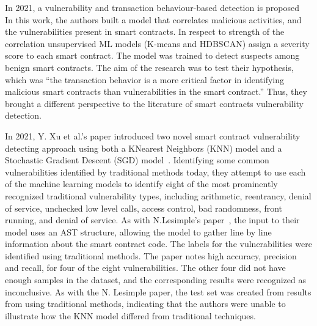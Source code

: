 In 2021, a vulnerability and transaction behaviour-based detection is proposed ~\cite{contractfuzzer}
 In this work, the authors built a model that correlates malicious activities, and the vulnerabilities present in smart contracts.
 In respect to strength of the correlation unsupervised ML models (K-means and HDBSCAN) assign a severity score to each smart contract.
 The model was trained to detect suspects among benign smart contracts. The aim of the research was to test their hypothesis, which was “the transaction behavior is a more critical factor in identifying malicious smart contracts than vulnerabilities in the smart contract.” Thus, they brought a different perspective to the literature of smart contracts vulnerability detection.

In 2021, Y. Xu et al.'s paper introduced two novel smart contract vulnerability detecting approach using both a KNearest Neighbors (KNN) model and a Stochastic Gradient Descent (SGD) model~\cite{slither}.
Identifying some common vulnerabilities identified by traditional methods today, they attempt to use each of the machine learning models to identify eight of the most prominently recognized traditional vulnerability types, including arithmetic, reentrancy, denial of service, unchecked low level calls, access control, bad randomness, front running, and denial of service.
As with N.Lesimple's paper~\cite{he2019learning}, the input to their model uses an AST structure, allowing the model to gather line by line information about the smart contract code.
The labels for the vulnerabilities were identified using traditional methods.
The paper notes high accuracy, precision and recall, for four of the eight vulnerabilities.
The other four did not have enough samples in the dataset, and the corresponding results were recognized as inconclusive. As with the N. Lesimple paper, the test set was created from results from using traditional methods, indicating that the authors were unable to illustrate how the KNN model differed from traditional techniques.

